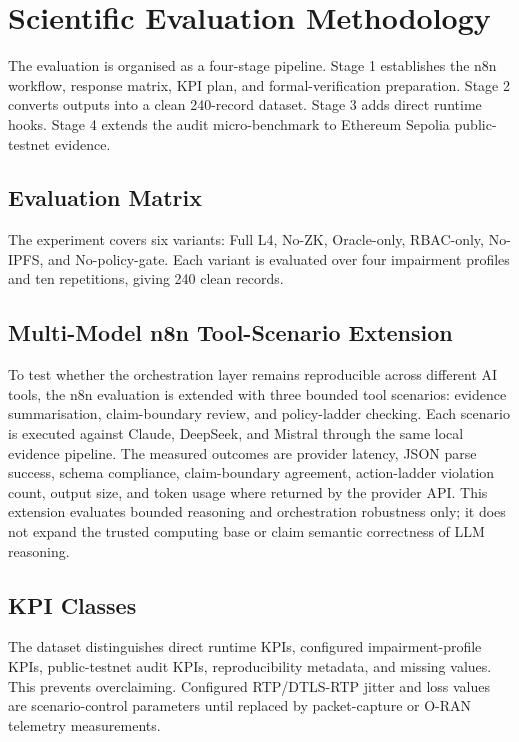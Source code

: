 \section{Scientific Evaluation Methodology}
The evaluation is organised as a four-stage pipeline. Stage 1 establishes the n8n workflow, response matrix, KPI plan, and formal-verification preparation. Stage 2 converts outputs into a clean 240-record dataset. Stage 3 adds direct runtime hooks. Stage 4 extends the audit micro-benchmark to Ethereum Sepolia public-testnet evidence.



\subsection{Evaluation Matrix}
The experiment covers six variants: Full L4, No-ZK, Oracle-only, RBAC-only, No-IPFS, and No-policy-gate. Each variant is evaluated over four impairment profiles and ten repetitions, giving 240 clean records.



\subsection{Multi-Model n8n Tool-Scenario Extension}
To test whether the orchestration layer remains reproducible across different AI tools, the n8n evaluation is extended with three bounded tool scenarios: evidence summarisation, claim-boundary review, and policy-ladder checking. Each scenario is executed against Claude, DeepSeek, and Mistral through the same local evidence pipeline. The measured outcomes are provider latency, JSON parse success, schema compliance, claim-boundary agreement, action-ladder violation count, output size, and token usage where returned by the provider API. This extension evaluates bounded reasoning and orchestration robustness only; it does not expand the trusted computing base or claim semantic correctness of LLM reasoning.

\subsection{KPI Classes}
The dataset distinguishes direct runtime KPIs, configured impairment-profile KPIs, public-testnet audit KPIs, reproducibility metadata, and missing values. This prevents overclaiming. Configured RTP/DTLS-RTP jitter and loss values are scenario-control parameters until replaced by packet-capture or O-RAN telemetry measurements.

